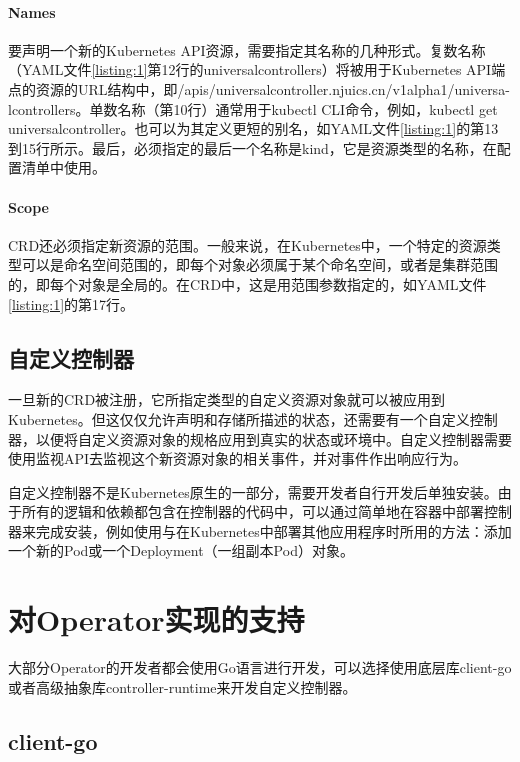 \documentclass[macfonts,master]{njuthesis}
\begin{document}
\paragraph{Names}

要声明一个新的Kubernetes API资源，需要指定其名称的几种形式。复数名称（YAML文件\ref{listing:1}第12行的universalcontrollers）将被用于Kubernetes API端点的资源的URL结构中，即/apis/universalcontroller.njuics.cn/v1alpha1/universa-lcontrollers。单数名称（第10行）通常用于kubectl CLI命令，例如，kubectl get universalcontroller。也可以为其定义更短的别名，如YAML文件\ref{listing:1}的第13到15行所示。最后，必须指定的最后一个名称是kind，它是资源类型的名称，在配置清单中使用。

\paragraph{Scope}

CRD还必须指定新资源的范围。一般来说，在Kubernetes中，一个特定的资源类型可以是命名空间范围的，即每个对象必须属于某个命名空间，或者是集群范围的，即每个对象是全局的。在CRD中，这是用范围参数指定的，如YAML文件\ref{listing:1}的第17行。

\subsection{自定义控制器}

一旦新的CRD被注册，它所指定类型的自定义资源对象就可以被应用到Kubernetes。但这仅仅允许声明和存储所描述的状态，还需要有一个自定义控制器，以便将自定义资源对象的规格应用到真实的状态或环境中。自定义控制器需要使用监视API去监视这个新资源对象的相关事件，并对事件作出响应行为。

自定义控制器不是Kubernetes原生的一部分，需要开发者自行开发后单独安装。由于所有的逻辑和依赖都包含在控制器的代码中，可以通过简单地在容器中部署控制器来完成安装，例如使用与在Kubernetes中部署其他应用程序时所用的方法：添加一个新的Pod或一个Deployment（一组副本Pod）对象。

\section{对Operator实现的支持}\label{section:wayofimplement}

大部分Operator的开发者都会使用Go语言进行开发，可以选择使用底层库client-go或者高级抽象库controller-runtime来开发自定义控制器。

\subsection{client-go}
\end{document}
